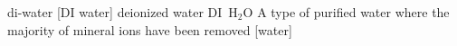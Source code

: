 \newglsXchemical%
{di-water}%
[{DI} water]%
{deionized water}%
{DI\ H$_2$O}%
{A type of purified water where the majority of mineral ions have been removed}%
[water]%